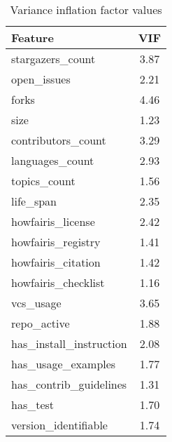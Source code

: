 \begin{table}
\centering
\caption{Variance inflation factor values}
\label{tab:vif}
\begin{tabular}{lc}
\toprule
                Feature &  VIF \\
\midrule
       stargazers\_count & 3.87 \\
            open\_issues & 2.21 \\
                  forks & 4.46 \\
                   size & 1.23 \\
     contributors\_count & 3.29 \\
        languages\_count & 2.93 \\
           topics\_count & 1.56 \\
              life\_span & 2.35 \\
      howfairis\_license & 2.42 \\
     howfairis\_registry & 1.41 \\
     howfairis\_citation & 1.42 \\
    howfairis\_checklist & 1.16 \\
              vcs\_usage & 3.65 \\
            repo\_active & 1.88 \\
has\_install\_instruction & 2.08 \\
     has\_usage\_examples & 1.77 \\
 has\_contrib\_guidelines & 1.31 \\
               has\_test & 1.70 \\
   version\_identifiable & 1.74 \\
\bottomrule
\end{tabular}
\end{table}
